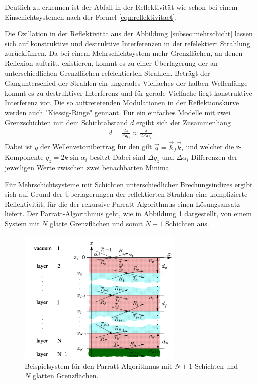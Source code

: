 Deutlich zu erkennen ist der Abfall in der Reflektivität wie schon
bei einem Einschichtsystemen nach der Formel \eqref{eqn:reflektivitaet}.

Die Ozillation in der Reflektivität aus der Abbildung \ref{subsec:mehrschicht}
lassen sich auf konstruktive und destruktive Interferenzen in
der refelektiert Strahlung zurückführen.
Da bei einem Mehrschichtsystem mehr
Grenzflächen, an denen Reflexion auftritt, existieren,
kommt es zu einer Überlagerung der an unterschiedlichen Grenzflächen
refelektierten Strahlen.
Beträgt der Gangunterschied der Strahlen
ein ungerades Vielfaches der halben Wellenlänge
kommt es zu destruktiver Interferenz und für gerade Vielfache
liegt konstruktive Interferenz vor.
Die so auftretetenden
Modulationen in der Reflektionskurve
werden auch "Kiessig-Ringe" gennant.
Für ein einfaches Modelle mit zwei
Grenzschichten mit dem Schichtabstand $d$
ergibt sich der Zusammenhang
\begin{align}
  d = \frac{2\pi}{\Delta q_z} \approx \frac{\lambda}{2\Delta \alpha_i}. \label{eqn:schichtabstand}
\end{align}
Dabei ist $q$ der Wellenvetorübertrag für den gilt
$\vec{q} = \vec{k}_f \vec{k}_i$ und welcher die z-Komponente $q_z=2k\sin \alpha_i$ besitzt
Dabei sind $\Delta q_z$ und $\Delta\alpha_i$ Differenzen
der jeweiligen
Werte zwischen zwei benachbarten Minima. %

Für Mehrschichtsysteme mit Schichten
unterschiedlicher Brechungsindizes
ergibt sich auf Grund der Überlagerungen der reflektierten
Strahlen eine
komplizierte Reflektivität, für die der
rekursive Parratt-Algorithmus einen Lösungsansatz
liefert.
Der Parratt-Algorithmus geht, wie in Abbildung \ref{fig:parratt_syst} dargestellt, von einem System
mit $N$ glatte Grenzflächen und somit $N+1$ Schichten aus.

\begin{figure}
  \centering
\includegraphics[width=0.7\textwidth]{bilder/mehrschicht_parratt.PNG}
\caption{Beispielsystem für den Parratt-Algorithmus
mit $N+1$ Schichten und $N$ glatten Grenzflächen.\cite{sample}}
\label{fig:parratt_syst}
\end{figure}

